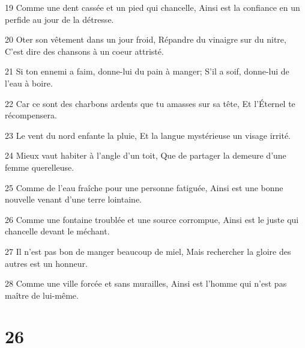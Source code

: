 \par 19 Comme une dent cassée et un pied qui chancelle, Ainsi est la confiance en un perfide au jour de la détresse.
\par 20 Oter son vêtement dans un jour froid, Répandre du vinaigre sur du nitre, C'est dire des chansons à un coeur attristé.
\par 21 Si ton ennemi a faim, donne-lui du pain à manger; S'il a soif, donne-lui de l'eau à boire.
\par 22 Car ce sont des charbons ardents que tu amasses sur sa tête, Et l'Éternel te récompensera.
\par 23 Le vent du nord enfante la pluie, Et la langue mystérieuse un visage irrité.
\par 24 Mieux vaut habiter à l'angle d'un toit, Que de partager la demeure d'une femme querelleuse.
\par 25 Comme de l'eau fraîche pour une personne fatiguée, Ainsi est une bonne nouvelle venant d'une terre lointaine.
\par 26 Comme une fontaine troublée et une source corrompue, Ainsi est le juste qui chancelle devant le méchant.
\par 27 Il n'est pas bon de manger beaucoup de miel, Mais rechercher la gloire des autres est un honneur.
\par 28 Comme une ville forcée et sans murailles, Ainsi est l'homme qui n'est pas maître de lui-même.

\chapter{26}

